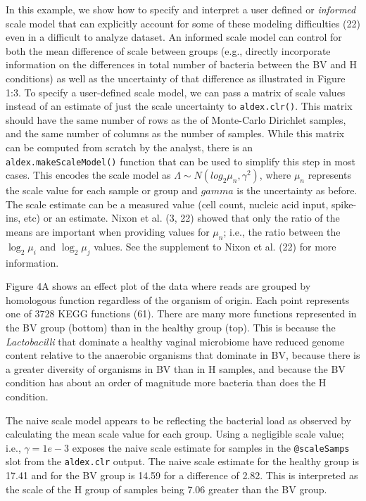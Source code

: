 \documentclass[
]{article}
\begin{document}
In this example, we show how to specify and interpret a user defined or
\emph{informed} scale model that can explicitly account for some of
these modeling difficulties (22) even in a difficult to analyze dataset.
An informed scale model can control for both the mean difference of
scale between groups (e.g., directly incorporate information on the
differences in total number of bacteria between the BV and H conditions)
as well as the uncertainty of that difference as illustrated in Figure
1:3. To specify a user-defined scale model, we can pass a matrix of
scale values instead of an estimate of just the scale uncertainty to
\texttt{aldex.clr()}. This matrix should have the same number of rows as
the of Monte-Carlo Dirichlet samples, and the same number of columns as
the number of samples. While this matrix can be computed from scratch by
the analyst, there is an \texttt{aldex.makeScaleModel()} function that
can be used to simplify this step in most cases. This encodes the scale
model as \(\Lambda \sim N(log_2 \mu_n, \gamma^{2})\), where \(\mu_n\)
represents the scale value for each sample or group and \(gamma\) is the
uncertainty as before. The scale estimate can be a measured value (cell
count, nucleic acid input, spike-ins, etc) or an estimate. Nixon et al.
(3, 22) showed that only the ratio of the means are important when
providing values for \(\mu_n\); i.e., the ratio between the
\(\log_2 \mu_i\) and \(\log_2 \mu_j\) values. See the supplement to
Nixon et al. (22) for more information.

Figure 4A shows an effect plot of the data where reads are grouped by
homologous function regardless of the organism of origin. Each point
represents one of 3728 KEGG functions (61). There are many more
functions represented in the BV group (bottom) than in the healthy group
(top). This is because the \textit{Lactobacilli} that dominate a healthy
vaginal microbiome have reduced genome content relative to the anaerobic
organisms that dominate in BV, because there is a greater diversity of
organisms in BV than in H samples, and because the BV condition has
about an order of magnitude more bacteria than does the H condition.

The naive scale model appears to be reflecting the bacterial load as
observed by calculating the mean scale value for each group. Using a
negligible scale value; i.e., \(\gamma=1e-3\) exposes the naive scale
estimate for samples in the \texttt{@scaleSamps} slot from the
\texttt{aldex.clr} output. The naive scale estimate for the healthy
group is 17.41 and for the BV group is 14.59 for a difference of 2.82.
This is interpreted as the scale of the H group of samples being 7.06
greater than the BV group.
\end{document}

